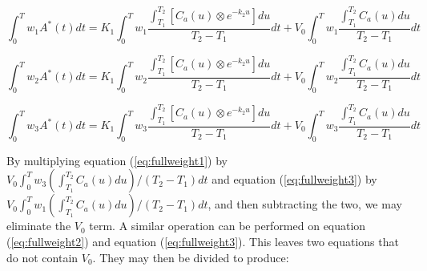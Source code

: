 \begin{equation}
\int_{0}^{T} w_{1}A^{*}(t)dt = K_{1} \int_{0}^{T} w_{1}
\frac{\int_{T_1}^{T_2} \left[ C_{a}(u) \otimes e^{-k_{2}u} \right]
du}{T_2 - T_1} dt + V_{0} \int_{0}^{T}w_{1} \frac{\int_{T_1}^{T_2}
C_{a}(u) du}{T_2 - T_1} dt \label{eq:fullweight1}
\end{equation}

\begin{equation}
\int_{0}^{T} w_{2}A^{*}(t)dt = K_{1} \int_{0}^{T} w_{2}
\frac{\int_{T_1}^{T_2} \left[ C_{a}(u) \otimes e^{-k_{2}u} \right]
du}{T_2 - T_1} dt + V_{0} \int_{0}^{T}w_{2} \frac{\int_{T_1}^{T_2}
C_{a}(u) du}{T_2 - T_1} dt \label{eq:fullweight2}
\end{equation}

\begin{equation}
\int_{0}^{T} w_{3}A^{*}(t)dt = K_{1} \int_{0}^{T} w_{3}
\frac{\int_{T_1}^{T_2} \left[ C_{a}(u) \otimes e^{-k_{2}u} \right]
du}{T_2 - T_1} dt + V_{0} \int_{0}^{T}w_{3} \frac{\int_{T_1}^{T_2}
C_{a}(u) du}{T_2 - T_1} dt \label{eq:fullweight3}
\end{equation}

By multiplying equation (\ref{eq:fullweight1}) by $V_{0}
\int_{0}^{T} w_{3} {(\int_{T_1}^{T_2}C_{a}(u)du)}/{(T_2 - T_1)} dt$
and equation (\ref{eq:fullweight3}) by $V_{0} \int_{0}^{T} w_{1}
{(\int_{T_1}^{T_2}C_{a}(u)du)}/{(T_2 - T_1)} dt$, and then
subtracting the two, we may eliminate the $V_{0}$ term.  A similar
operation can be performed on equation (\ref{eq:fullweight2}) and
equation (\ref{eq:fullweight3}).  This leaves two equations that do
not contain $V_{0}$.  They may then be divided to produce:

